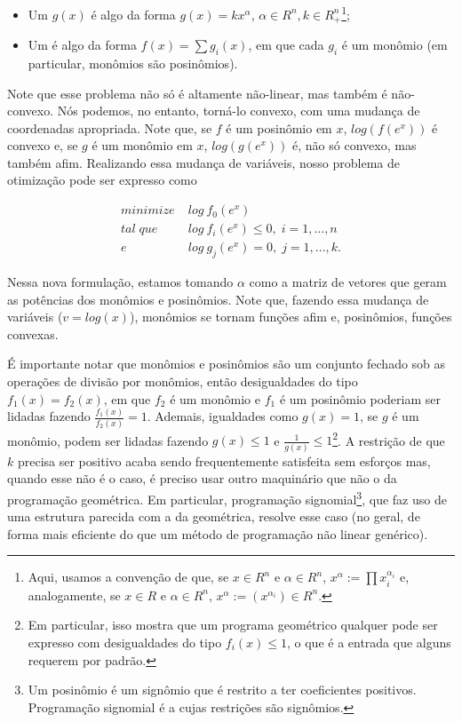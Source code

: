 \documentclass{article}
\begin{document}
\begin{itemize}
\item Um  $g(x)$ é algo da forma $g(x) =
  kx^{\alpha}$, $\alpha \in R^n, k \in R^n_{+}$\footnote{Aqui, usamos
    a convenção de que, se $x \in R^n$ e $\alpha \in R^n$, $x^{\alpha}
    := \prod x_i^{\alpha_i}$ e, analogamente, se $x \in R$ e $\alpha \in R^n$, $x^\alpha :=
    (x^{\alpha_i}) \in R^n$.};
\item Um  é algo da forma $f(x) = \sum g_i(x)$,
  em que cada $g_i$ é um monômio (em particular, monômios são
  posinômios).
\end{itemize}

Note que esse problema não só é altamente não-linear, mas também é
não-convexo. Nós podemos, no entanto, torná-lo convexo, com uma
mudança de coordenadas apropriada. Note que, se $f$ é um posinômio em
$x$, $log(f(e^x))$ é convexo e, se $g$ é um monômio em $x$,
$log(g(e^x))$ é, não só convexo, mas também afim. Realizando essa
mudança de variáveis, nosso problema de otimização pode ser expresso
como


\begin{align*}
  minimize\; & log\ f_0 (e^x)\\
  tal\; que\; & log\ f_i (e^x) \leq 0,\; i = 1, ..., n\\
  e\; & log\ g_j (e^x) = 0,\; j = 1, ..., k.
\end{align*}

Nessa nova formulação, estamos tomando $\alpha$ como a matriz de
vetores que geram as potências dos monômios e posinômios. Note que,
fazendo essa mudança de variáveis ($v = log(x)$), monômios se tornam
funções afim e, posinômios, funções convexas.

É importante notar que monômios e posinômios são um conjunto fechado
sob as operações de divisão por monômios, então desigualdades do tipo
$f_1(x) = f_2(x)$, em que $f_2$ é um monômio e $f_1$ é um posinômio
poderiam ser lidadas fazendo $\frac{f_1(x)}{f_2(x)} = 1$. Ademais,
igualdades como $g(x) = 1$, se $g$ é um monômio, podem ser lidadas
fazendo $g(x) \leq 1$ e $\frac{1}{g(x)} \leq 1$\footnote{Em
  particular, isso mostra que um programa geométrico qualquer pode ser
  expresso com desigualdades do tipo $f_i(x) \leq 1$, o que é a
  entrada que alguns  requerem por padrão.}. A
restrição de que $k$ precisa ser positivo acaba sendo frequentemente
satisfeita sem esforços mas, quando esse não é o caso, é preciso
usar outro maquinário que não o da programação geométrica. Em
particular, programação signomial\footnote{Um posinômio é um signômio
  que é restrito a ter coeficientes positivos. Programação signomial é
  a cujas restrições são signômios.}, que faz uso de uma estrutura
parecida com a da geométrica, resolve esse caso (no geral, de forma
mais eficiente do que um método de programação não linear
genérico).
\end{document}
